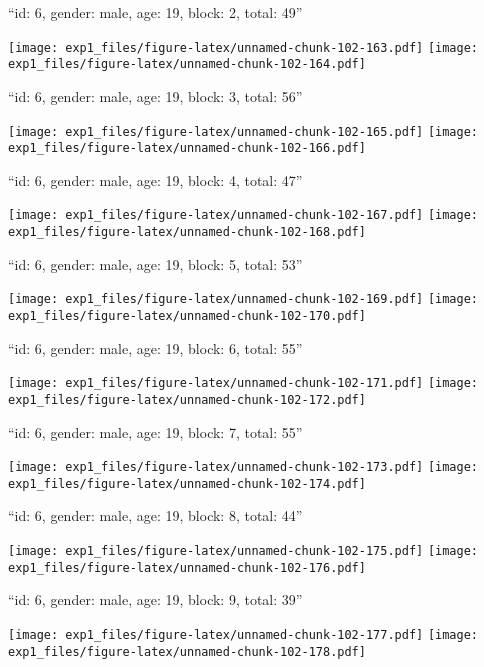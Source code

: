\documentclass[11pt,,]{article}
\begin{document}
\newpage
[1] 

``id: 6, gender: male, age: 19, block: 2, total: 49''

\texttt{[image: exp1\_files/figure-latex/unnamed-chunk-102-163.pdf]}
\texttt{[image: exp1\_files/figure-latex/unnamed-chunk-102-164.pdf]}

\newpage
[1] 

``id: 6, gender: male, age: 19, block: 3, total: 56''

\texttt{[image: exp1\_files/figure-latex/unnamed-chunk-102-165.pdf]}
\texttt{[image: exp1\_files/figure-latex/unnamed-chunk-102-166.pdf]}

\newpage
[1] 

``id: 6, gender: male, age: 19, block: 4, total: 47''

\texttt{[image: exp1\_files/figure-latex/unnamed-chunk-102-167.pdf]}
\texttt{[image: exp1\_files/figure-latex/unnamed-chunk-102-168.pdf]}

\newpage
[1] 

``id: 6, gender: male, age: 19, block: 5, total: 53''

\texttt{[image: exp1\_files/figure-latex/unnamed-chunk-102-169.pdf]}
\texttt{[image: exp1\_files/figure-latex/unnamed-chunk-102-170.pdf]}

\newpage
[1] 

``id: 6, gender: male, age: 19, block: 6, total: 55''

\texttt{[image: exp1\_files/figure-latex/unnamed-chunk-102-171.pdf]}
\texttt{[image: exp1\_files/figure-latex/unnamed-chunk-102-172.pdf]}

\newpage
[1] 

``id: 6, gender: male, age: 19, block: 7, total: 55''

\texttt{[image: exp1\_files/figure-latex/unnamed-chunk-102-173.pdf]}
\texttt{[image: exp1\_files/figure-latex/unnamed-chunk-102-174.pdf]}

\newpage
[1] 

``id: 6, gender: male, age: 19, block: 8, total: 44''

\texttt{[image: exp1\_files/figure-latex/unnamed-chunk-102-175.pdf]}
\texttt{[image: exp1\_files/figure-latex/unnamed-chunk-102-176.pdf]}

\newpage
[1] 

``id: 6, gender: male, age: 19, block: 9, total: 39''

\texttt{[image: exp1\_files/figure-latex/unnamed-chunk-102-177.pdf]}
\texttt{[image: exp1\_files/figure-latex/unnamed-chunk-102-178.pdf]}
\end{document}
